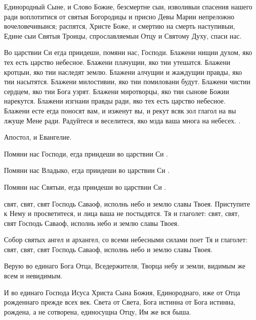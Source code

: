 \begin{mymulticols}


 Единородный Сыне, и Слово Божие, безсмертне сыи, изволивыи спасения нашего ради воплотитися от святыя Богородицы и присно Девы Марии непреложно вочеловечивыися; распятся, Христе Боже, и смертию на смерть наступивыи, Едине сыи Святыя Троицы, спрославляемыи Отцу и Святому Духу, спаси нас.




Во царствии Си егда приидеши, помяни нас, Господи. Блажени нищии духом, яко тех есть царство небесное. Блажени плачущии, яко тии утешатся. Блажени кротцыи, яко тии наследят землю. Блажени алчущии и жаждущии правды, яко тии насытятся. Блажени милостивии, яко тии помиловани будут. Блажени чистии сердцем, яко тии Бога узрят. Блажени миротворцы, яко тии сынове Божии нарекутся. Блажени изгнани правды ради, яко тех есть царство небесное. Блажени есте егда поносят вам, и изженут вы, и рекут всяк зол глагол на вы лжуще Мене ради. Радуйтеся и веселитеся, яко мзда ваша многа на небесех. .


 Апостол, и Евангелие.


 Помяни нас Господи, егда приидеши во царствии Си .

Помяни нас Владыко, егда приидеши во царствии Си .

Помяни нас Святыи, егда приидеши во царствии Си .


 свят, свят, свят Господь Саваоф, исполнь небо и землю славы Твоея. Приступите к Нему и просветитеся, и лица ваша не постыдятся.  Тя и глаголет: свят, свят, свят Господь Саваоф, исполнь небо и землю славы Твоея. 

 Собор святых ангел и архангел, со всеми небесными силами поет Тя и глаголет: свят, свят, свят Господь Саваоф, исполнь небо и землю славы Твоея. 


Верую во единаго Бога Отца, Вседержителя, Творца небу и земли, видимым же всем и невидимым.

И во единаго Господа Исуса Христа Сына Божия, Единороднаго, иже от Отца рожденнаго прежде всех век. Света от Света, Бога истинна от Бога истинна, рождена, а не сотворена, единосущна Отцу, Им же вся быша.


\end{mymulticols}
